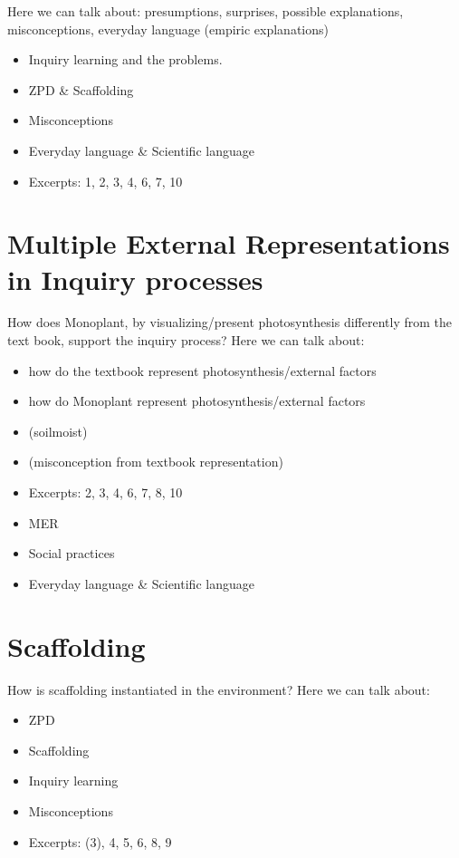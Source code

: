 Here we can talk about: 
presumptions, surprises, possible explanations, misconceptions, everyday language (empiric explanations) 


\begin{itemize}
\item{Inquiry learning and the problems. \citep{de1998scientific}}
\item{ZPD \& Scaffolding}
\item{Misconceptions}
\item{Everyday language \& Scientific language}
\item{Excerpts: 1, 2, 3, 4, 6, 7, 10}
\end{itemize}



\section{Multiple External Representations in Inquiry processes}
How does Monoplant, by visualizing/present photosynthesis differently from the text book, support the inquiry process? 
Here we can talk about: 
\begin{itemize}
\item{how do the textbook represent photosynthesis/external factors}
\item{how do Monoplant represent photosynthesis/external factors}
\item{ (soilmoist)}
\item{ (misconception from textbook representation)}
\item{Excerpts: 2, 3, 4, 6, 7, 8, 10}
\item{MER}
\item{Social practices}
\item{Everyday language \& Scientific language}
\end{itemize}




\section{Scaffolding}
How is scaffolding instantiated in the environment?
Here we can talk about: 
\begin{itemize}
\item{ZPD}
\item{Scaffolding}
\item{Inquiry learning}
\item{Misconceptions}
\item{Excerpts: (3), 4, 5, 6, 8, 9}
\end{itemize}



